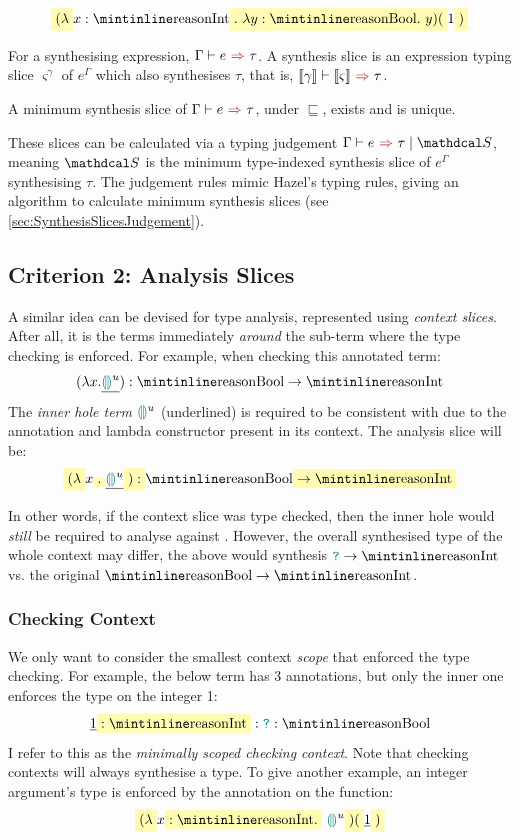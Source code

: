 \[\hlcmaths[yellow!30]{(\lambda} x: \code{Int}\hlcmaths[yellow!30]{.\ \lambda y : \code{Bool}.\ y)(}1\hlcmaths[yellow!30]{)}\]

\begin{definition}
For a synthesising expression, $\synthesis{e}{\tau}$. A synthesis slice is an expression typing slice $\varsigma^{\gamma}$ of $e^\Gamma$ which also synthesises $\tau$, that is, $\synthesis[\type{\gamma}]{\type{\varsigma}}{\tau}$.
\end{definition}
\begin{proposition}
A minimum synthesis slice of $\synthesis{e}{\tau}$, under $\sqsubseteq$, exists and is unique.
\end{proposition}

These slices can be calculated via a typing judgement $\synthesisslice{e}{\tau}{\S}$, meaning $\S$ is the minimum type-indexed synthesis slice of $e^\Gamma$ synthesising $\tau$. The judgement rules mimic Hazel's typing rules, giving an algorithm to calculate minimum synthesis slices (see \cref{sec:SynthesisSlicesJudgement}).

\subsection{Criterion 2: Analysis Slices}\label{sec:AnalysisSlices}
A similar idea can be devised for type analysis, represented using \textit{context slices}. After all, it is the terms immediately \textit{around} the sub-term where the type checking is enforced. For example, when checking this annotated term:
\[(\lambda x. \underline{\hole^u}) : \code{Bool} \to \code{Int}\]
The \textit{inner hole term} ${\color{teal}\llparenthesis}  {\color{teal}\rrparenthesis}^u$ (underlined) is required to be consistent with  due to the annotation and lambda constructor present in its context. The analysis slice will be:
\[\hlcmaths[yellow!30]{(\lambda} x\hlcmaths[yellow!30]{.} \underline{\hole^u} \hlcmaths[yellow!30]{) : } \code{Bool} \hlcmaths[yellow!30]{\to \code{Int}}\]

In other words, if the context slice was type checked, then the inner hole would \textit{still} be required to analyse against . However, the overall synthesised type of the whole context may differ, the above would synthesis $\dyn \to \code{Int}$ vs. the original $\code{Bool} \to \code{Int}$.


\subsubsection{Checking Context}
\label{sec:CheckingContexts}
We only want to consider the smallest context \textit{scope} that enforced the type checking. For example, the below term has 3 annotations, but only the inner one enforces the  type on the integer 1:
\[\underline{1} \hlcmaths[yellow!30]{: \code{Int}} : \dyn : \code{Bool}\]
I refer to this as the \textit{minimally scoped checking context}. Note that checking contexts will always synthesise a type. To give another example, an integer argument's type is enforced by the annotation on the function:
\[\hlcmaths[yellow!30]{(\lambda} x \hlcmaths[yellow!30]{: \code{Int}.}\ \hole^u\hlcmaths[yellow!30]{)(}\underline{1}\hlcmaths[yellow!30]{)}\]


